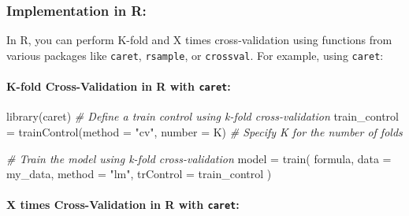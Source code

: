 \documentclass[
]{article}
\newenvironment{Shaded}{}{}
\newcommand{\AttributeTok}[1]{\textcolor[rgb]{0.49,0.56,0.16}{#1}}
\newcommand{\CommentTok}[1]{\textcolor[rgb]{0.38,0.63,0.69}{\textit{#1}}}
\newcommand{\FunctionTok}[1]{\textcolor[rgb]{0.02,0.16,0.49}{#1}}
\newcommand{\NormalTok}[1]{#1}
\newcommand{\OtherTok}[1]{\textcolor[rgb]{0.00,0.44,0.13}{#1}}
\newcommand{\StringTok}[1]{\textcolor[rgb]{0.25,0.44,0.63}{#1}}
\begin{document}
\hypertarget{implementation-in-r}{%
\subsubsection{Implementation in R:}\label{implementation-in-r}}

In R, you can perform K-fold and X times cross-validation using
functions from various packages like \texttt{caret}, \texttt{rsample},
or \texttt{crossval}. For example, using \texttt{caret}:

\hypertarget{k-fold-cross-validation-in-r-with-caret}{%
\paragraph{\texorpdfstring{K-fold Cross-Validation in R with
\texttt{caret}:}{K-fold Cross-Validation in R with caret:}}\label{k-fold-cross-validation-in-r-with-caret}}

\begin{Shaded}
\begin{Highlighting}[]
\FunctionTok{library}\NormalTok{(caret)}
\CommentTok{\# Define a train control using k{-}fold cross{-}validation}
\NormalTok{train\_control }\OtherTok{=}
	\FunctionTok{trainControl}\NormalTok{(}\AttributeTok{method =} \StringTok{"cv"}\NormalTok{, }\AttributeTok{number =}\NormalTok{ K)  }
\CommentTok{\# Specify K for the number of folds}

\CommentTok{\# Train the model using k{-}fold cross{-}validation}
\NormalTok{model }\OtherTok{=}
	\FunctionTok{train}\NormalTok{(}
\NormalTok{    formula, }
    \AttributeTok{data =}\NormalTok{ my\_data,}
    \AttributeTok{method =} \StringTok{"lm"}\NormalTok{,}
    \AttributeTok{trControl =}\NormalTok{ train\_control}
\NormalTok{  )}
\end{Highlighting}
\end{Shaded}

\hypertarget{x-times-cross-validation-in-r-with-caret}{%
\paragraph{\texorpdfstring{X times Cross-Validation in R with
\texttt{caret}:}{X times Cross-Validation in R with caret:}}\label{x-times-cross-validation-in-r-with-caret}}
\end{document}
